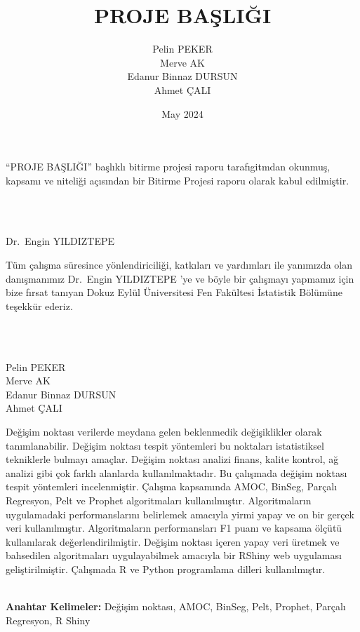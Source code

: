 \documentclass[12pt,twoside]{deuthesis}
\title{PROJE BAŞLIĞI}
\author{Pelin PEKER \\ Merve AK \\ Edanur Binnaz DURSUN \\ Ahmet ÇALI} %
\date{May 2024}
\begin{document}
  \maketitle

\frontmatter %
\pagestyle{empty} %

\begin{preface}
	``PROJE BAŞLIĞI'' başlıklı bitirme projesi raporu tarafıgitmdan okunmuş, kapsamı ve niteliği açısından bir Bitirme Projesi raporu olarak kabul edilmiştir.\\
\strut \\
\strut \\
Dr.~Engin YILDIZTEPE
\end{preface}

  \begin{acknowledgements}
    Tüm çalışma süresince yönlendiriciliği, katkıları ve yardımları ile yanımızda olan danışmanımız Dr.~Engin YILDIZTEPE 'ye ve böyle bir çalışmayı yapmamız için bize fırsat tanıyan Dokuz Eylül Üniversitesi Fen Fakültesi İstatistik Bölümüne teşekkür ederiz.\\
    \strut \\
    \strut \\
    Pelin PEKER\\
    Merve AK\\
    Edanur Binnaz DURSUN\\
    Ahmet ÇALI\\
  \end{acknowledgements}

\begin{abstractTR}
	Değişim noktası verilerde meydana gelen beklenmedik değişiklikler olarak tanımlanabilir. Değişim noktası tespit yöntemleri bu noktaları istatistiksel tekniklerle bulmayı amaçlar. Değişim noktası analizi finans, kalite kontrol, ağ analizi gibi çok farklı alanlarda kullanılmaktadır. Bu çalışmada değişim noktası tespit yöntemleri incelenmiştir. Çalışma kapsamında AMOC, BinSeg, Parçalı Regresyon, Pelt ve Prophet algoritmaları kullanılmıştır. Algoritmaların uygulamadaki performanslarını belirlemek amacıyla yirmi yapay ve on bir gerçek veri kullanılmıştır. Algoritmaların performansları F1 puanı ve kapsama ölçütü kullanılarak değerlendirilmiştir. Değişim noktası içeren yapay veri üretmek ve bahsedilen algoritmaları uygulayabilmek amacıyla bir RShiny web uygulaması geliştirilmiştir. Çalışmada R ve Python programlama dilleri kullanılmıştır.\\
\strut \\

\textbf{Anahtar Kelimeler:} Değişim noktası, AMOC, BinSeg, Pelt, Prophet, Parçalı Regresyon, R Shiny
\end{abstractTR}
\end{document}
